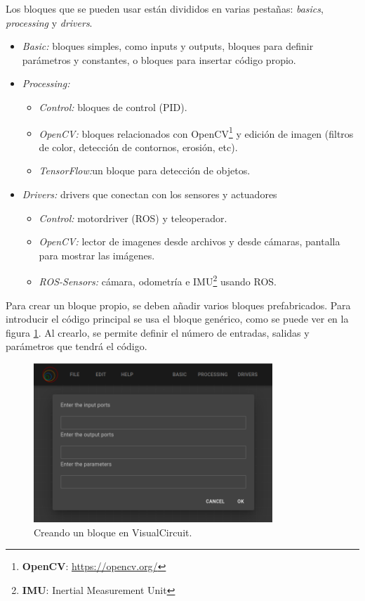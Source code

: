 Los bloques que se pueden usar están divididos en varias pestañas: \textit{basics}, \textit{processing} y \textit{drivers}.
\begin{itemize}
    \item \textit{Basic:} bloques simples, como inputs y outputs, bloques para definir parámetros y constantes, o bloques para insertar código propio.
    \item \textit{Processing:}
    \begin{itemize}
        \item \textit{Control:} bloques de control (PID).
        \item \textit{OpenCV:} bloques relacionados con OpenCV\footnote{\textbf{OpenCV}: \url{https://opencv.org/}} y edición de imagen (filtros de color, detección de contornos, erosión, etc).
        \item \textit{TensorFlow:}un bloque para detección de objetos.
    \end{itemize}
    \item \textit{Drivers:} drivers que conectan con los sensores y actuadores
    \begin{itemize}
        \item \textit{Control:} motordriver (ROS) y teleoperador.
        \item \textit{OpenCV:} lector de imagenes desde archivos y desde cámaras, pantalla para mostrar las imágenes.
        \item \textit{ROS-Sensors:}  cámara, odometría e IMU\footnote{\textbf{IMU}: Inertial Measurement Unit} usando ROS.
    \end{itemize}
\end{itemize}

Para crear un bloque propio, se deben añadir varios bloques prefabricados. Para introducir el código principal se usa el bloque genérico,
como se puede ver en la figura \ref{fig:VC_creando_bloque}. Al crearlo, se permite definir el número de entradas, salidas y parámetros que tendrá el código.

\begin{figure} [H]
    \begin{center}
        \includegraphics[width=9cm]{figs/c4/VC_pre_codeblock.png}
    \end{center}
    \caption[Creando un bloque en VisualCircuit]{Creando un bloque en VisualCircuit.}
    \label{fig:VC_creando_bloque}
\end{figure}

